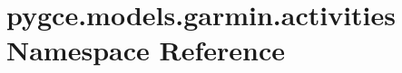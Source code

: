 \hypertarget{namespacepygce_1_1models_1_1garmin_1_1activities}{}\section{pygce.\+models.\+garmin.\+activities Namespace Reference}
\label{namespacepygce_1_1models_1_1garmin_1_1activities}
